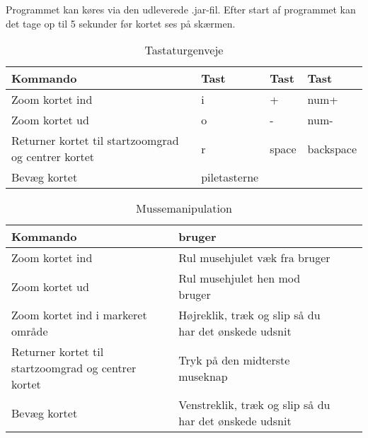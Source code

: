 Programmet kan køres via den udleverede .jar-fil. Efter start af programmet kan det tage op til 5 sekunder før kortet ses på skærmen.
\begin{table}[h!t]
\centering
	\caption{Tastaturgenveje}
	\begin{tabular}{p{3cm} l l l}
		\hline\hline
		Kommando & Tast & Tast & Tast \\ [0.5ex]
		\hline
		Zoom kortet ind & i & + & num+\\
		Zoom kortet ud & o & - & num-\\
		Returner kortet til startzoomgrad og centrer kortet & r & space & backspace\\
		Bevæg kortet & piletasterne\\
		\hline
	\end{tabular}
\end{table}

\begin{table}[h!t]
\centering
	\caption{Mussemanipulation}
	\begin{tabular}{p{3cm} l l p{5cm}}
		\hline\hline
		Kommando & bruger \\ [0.5ex]
		\hline
		Zoom kortet ind & Rul musehjulet væk fra bruger\\
		Zoom kortet ud & Rul musehjulet hen mod bruger\\
		Zoom kortet ind i markeret område & Højreklik, træk og slip så du har det ønskede udsnit\\
		Returner kortet til startzoomgrad og centrer kortet & Tryk på den midterste museknap\\
		Bevæg kortet & Venstreklik, træk og slip så du har det ønskede udsnit\\
		\hline
	\end{tabular}
\end{table}